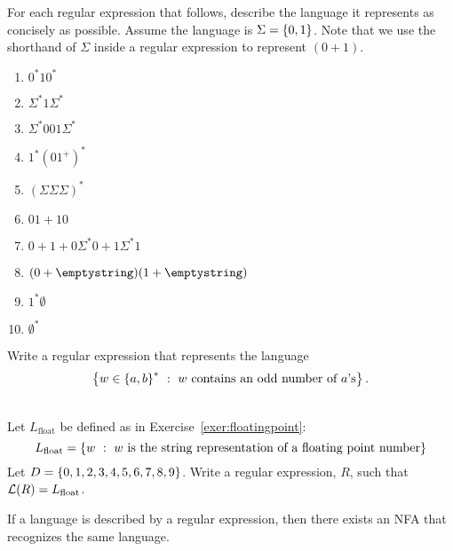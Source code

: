 \documentclass[twoside,letterpaper,openany]{book}
\begin{document}
\begin{exer}
For each regular expression that follows, describe the language it represents as concisely as possible. Assume the language is $\Sigma = \left\lbrace 0, 1 \right\rbrace$. Note that we use the shorthand of $\Sigma$ inside a regular expression to represent $(0 + 1)$.
\begin{enumerate}
\item $0^*10^*$
\item $\Sigma^*1\Sigma^*$
\item $\Sigma^*001\Sigma^*$
\item $1^*(01^+)^*$
\item $(\Sigma\Sigma\Sigma)^*$
\item $01 + 10$
\item $0 + 1 + 0\Sigma^*0 + 1\Sigma^*1$
\item $(0 + \emptystring)(1 + \emptystring)$
\item $1^*\emptyset$
\item $\emptyset^*$
\end{enumerate}
\end{exer}

\begin{exer}
Write a regular expression that represents the language 
\[\left\lbrace w\in\left\lbrace a, b \right\rbrace^{*}\ :\ w~\textrm{contains an odd number of $a$'s} \right\rbrace.\]
\end{exer}

\begin{exer}
~\\Let $L_{\mathrm{float}}$ be defined as in Exercise~\ref{exer:floatingpoint}:
\[L_{\mathrm{float}} = \left\lbrace w\ :\ w~\textrm{is the string representation of a floating point number} \right\rbrace\]
Let $D = \left\lbrace 0, 1, 2, 3, 4, 5, 6, 7, 8, 9 \right\rbrace$. Write a regular expression, $R$, such that $\mathcal{L}(R) = L_{\mathrm{float}}$.
\end{exer}

\begin{lemma}
If a language is described by a regular expression, then there exists an NFA that recognizes the same language.
\end{lemma}
\end{document}
